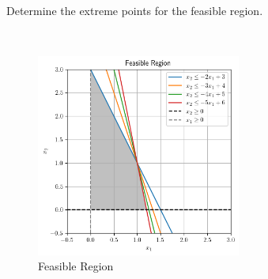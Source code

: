 Determine the extreme points for the feasible region.

\begin{solution}
  \ \\
  \begin{figure}[h]
    \centering
    \includegraphics[width=0.6\textwidth]{problem_6i.png}
    \caption{Feasible Region}
    \label{fig:problem_6i}
  \end{figure}
  \vfill
  \ \\
\end{solution}